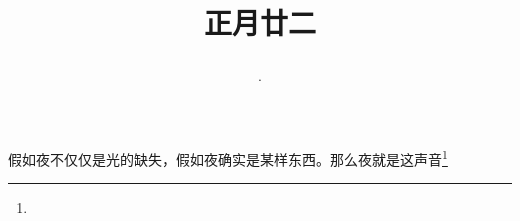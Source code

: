\title{\date[d=2,m=3,y=2024][year:cn-y,年,month:cn,day:cn,日,·,weekday]·正月廿二 }
假如夜不仅仅是光的缺失，假如夜确实是某样东西。那么夜就是这声音\footnote{ }

